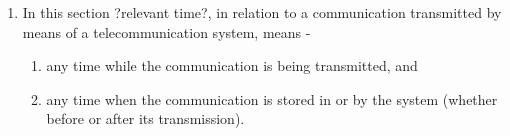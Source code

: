 \documentclass[12pt,a4paper]{article}
\begin{document}
\begin{appendices}
\begin{enumerate}
			\item{In this section ?relevant time?, in relation to a communication transmitted by means of a telecommunication system, means -}
				
				\begin{enumerate}
					\item{any time while the communication is being transmitted, and}
					\item{any time when the communication is stored in or by the system (whether before or after its transmission).}
				\end{enumerate}		
		\end{enumerate}
	
	\end{appendices}	
	
\end{document}
